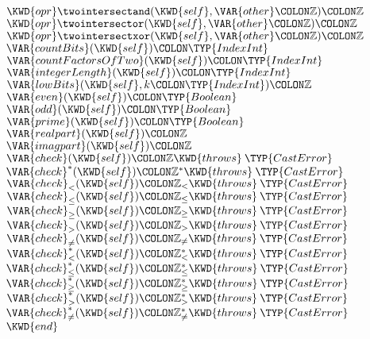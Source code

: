 \begin{Fortress}
\(  \KWD{opr} \mathord{\twointersectand}(\KWD{self}, \VAR{other}\COLON \mathbb{Z})\COLON \mathbb{Z}\)\\
\(  \KWD{opr} \mathord{\twointersector}(\KWD{self}, \VAR{other}\COLON \mathbb{Z})\COLON \mathbb{Z}\)\\
\(  \KWD{opr} \mathord{\twointersectxor}(\KWD{self}, \VAR{other}\COLON \mathbb{Z})\COLON \mathbb{Z}\)\\
\(  \VAR{countBits}(\KWD{self})\COLON \TYP{IndexInt}\)\\
\(  \VAR{countFactorsOfTwo}(\KWD{self})\COLON \TYP{IndexInt}\)\\
\(  \VAR{integerLength}(\KWD{self})\COLON \TYP{IndexInt}\)\\
\(  \VAR{lowBits}(\KWD{self}, k\COLON \TYP{IndexInt})\COLON \mathbb{Z}\)\\
\(  \VAR{even}(\KWD{self})\COLON \TYP{Boolean}\)\\
\(  \VAR{odd}(\KWD{self})\COLON \TYP{Boolean}\)\\
\(  \VAR{prime}(\KWD{self})\COLON \TYP{Boolean}\)\\
\(  \VAR{realpart}(\KWD{self})\COLON \mathbb{Z}\)\\
\(  \VAR{imagpart}(\KWD{self})\COLON \mathbb{Z}\)\\
\(  \VAR{check}(\KWD{self})\COLON \mathbb{Z} \KWD{throws}\mskip 4mu plus 4mu\TYP{CastError}\)\\
\(  \VAR{check}^*(\KWD{self})\COLON \mathbb{Z}^* \KWD{throws}\mskip 4mu plus 4mu\TYP{CastError}\)\\
\(  \VAR{check}_{<}(\KWD{self})\COLON \mathbb{Z}_{<} \KWD{throws}\mskip 4mu plus 4mu\TYP{CastError}\)\\
\(  \VAR{check}_{\leq}(\KWD{self})\COLON \mathbb{Z}_{\leq} \KWD{throws}\mskip 4mu plus 4mu\TYP{CastError}\)\\
\(  \VAR{check}_{\geq}(\KWD{self})\COLON \mathbb{Z}_{\geq} \KWD{throws}\mskip 4mu plus 4mu\TYP{CastError}\)\\
\(  \VAR{check}_{>}(\KWD{self})\COLON \mathbb{Z}_{>} \KWD{throws}\mskip 4mu plus 4mu\TYP{CastError}\)\\
\(  \VAR{check}_{\neq}(\KWD{self})\COLON \mathbb{Z}_{\neq} \KWD{throws}\mskip 4mu plus 4mu\TYP{CastError}\)\\
\(  \VAR{check}^*_{<}(\KWD{self})\COLON \mathbb{Z}^*_{<} \KWD{throws}\mskip 4mu plus 4mu\TYP{CastError}\)\\
\(  \VAR{check}^*_{\leq}(\KWD{self})\COLON \mathbb{Z}^*_{\leq} \KWD{throws}\mskip 4mu plus 4mu\TYP{CastError}\)\\
\(  \VAR{check}^*_{\geq}(\KWD{self})\COLON \mathbb{Z}^*_{\geq} \KWD{throws}\mskip 4mu plus 4mu\TYP{CastError}\)\\
\(  \VAR{check}^*_{>}(\KWD{self})\COLON \mathbb{Z}^*_{>} \KWD{throws}\mskip 4mu plus 4mu\TYP{CastError}\)\\
\(  \VAR{check}^*_{\neq}(\KWD{self})\COLON \mathbb{Z}^*_{\neq} \KWD{throws}\mskip 4mu plus 4mu\TYP{CastError}\)\-\\\poptabs
\(\KWD{end}\)
\end{Fortress}


